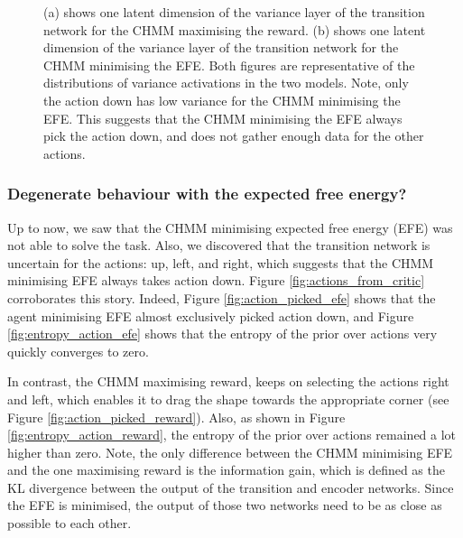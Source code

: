 \documentclass[twoside,11pt]{article}
\begin{document}
\begin{figure}[ht!]
    \caption{(a) shows one latent dimension of the variance layer of the transition network for the CHMM maximising the reward.
             (b) shows one latent dimension of the variance layer of the transition network for the CHMM minimising the EFE.
             Both figures are representative of the distributions of variance activations in the two models.
             Note, only the action down has low variance for the CHMM minimising the EFE.
             This suggests that the CHMM minimising the EFE always pick the action down, and does not gather enough data for the other actions.
    }
    \label{fig:cka-chmm-trans-sa}
\end{figure}

\subsubsection{Degenerate behaviour with the expected free energy?}

Up to now, we saw that the CHMM minimising expected free energy (EFE) was not able to solve the task. Also, we discovered that the transition network is uncertain for the actions: up, left, and right, which suggests that the CHMM minimising EFE always takes action down. Figure \ref{fig:actions_from_critic} corroborates this story. Indeed, Figure \ref{fig:action_picked_efe} shows that the agent minimising EFE almost exclusively picked action down, and Figure \ref{fig:entropy_action_efe} shows that the entropy of the prior over actions very quickly converges to zero.

In contrast, the CHMM maximising reward, keeps on selecting the actions right and left, which enables it to drag the shape towards the appropriate corner (see Figure \ref{fig:action_picked_reward}). Also, as shown in Figure \ref{fig:entropy_action_reward}, the entropy of the prior over actions remained a lot higher than zero. Note, the only difference between the CHMM minimising EFE and the one maximising reward is the information gain, which is defined as the KL divergence between the output of the transition and encoder networks. Since the EFE is minimised, the output of those two networks need to be as close as possible to each other.
\end{document}
